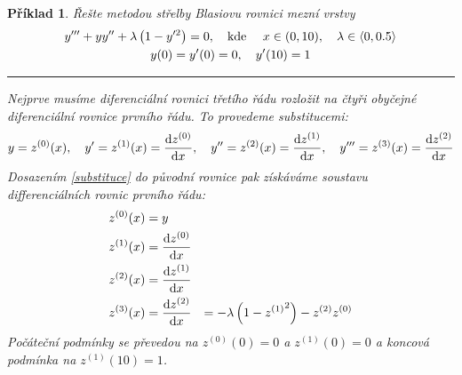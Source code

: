 \documentclass{article}
\newtheorem{example}{Příklad}
\begin{document}
\setcounter{example}{27}
\begin{example}
    Řešte metodou střelby Blasiovu rovnici mezní vrstvy
    \begin{gather*}
        y''' + y y'' + \lambda \left( 1 - y'^{2} \right)  = 0,
        \qq{kde } x \in (0,10) \qcomma \lambda \in \langle 0, 0.5 \rangle \\
        y(0) = y'(0) = 0 \qcomma y'(10) = 1
    \end{gather*}
    \smallskip
    \hrule
    \medskip
    Nejprve musíme diferenciální rovnici třetího řádu rozložit na čtyři obyčejné diferenciální rovnice prvního řádu. To provedeme substitucemi:
    \begin{equation}
        \label{substituce}
        y = z^{(0)}(x) \qcomma
        y' = z^{(1)}(x) = \dv{z^{(0)}}{x} \qcomma
        y'' = z^{(2)}(x) = \dv{z^{(1)}}{x} \qcomma
        y''' = z^{(3)}(x) = \dv{z^{(2)}}{x}
    \end{equation}
    Dosazením \ref{substituce} do původní rovnice pak získáváme soustavu differenciálních rovnic prvního řádu:
    \begin{equation}
        \begin{aligned}
           z^{(0)}(x) &= y \\
           z^{(1)}(x) &= \dv{z^{(0)}}{x} \\
           z^{(2)}(x) &= \dv{z^{(1)}}{x} \\
           z^{(3)}(x) &= \dv{z^{(2)}}{x}(x) &= -\lambda \left( 1 - {z^{(1)}}^{2} \right)  - z^{(2)}z^{(0)}
        \end{aligned}
    \end{equation}
    Počáteční podmínky se převedou na $z^{(0)}(0) = 0$ a $z^{(1)}(0) = 0$ a koncová podmínka na $z^{(1)}(10) = 1$.
    

\end{example}
\end{document}
